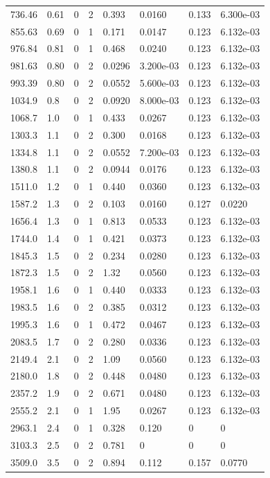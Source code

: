 \documentclass[preview]{standalone}
\begin{document}
{{\begin{tabular}{L{1.2cm}C{1.2cm} C{0.3cm}C{0.5cm} C{1.4cm}C{1.4cm} C{1.4cm}C{1.4cm}}
  736.46  &  0.61  & 0     &  2 &  0.393  & 0.0160  & 0.133 &  6.300e-03   \\ 
  855.63  &  0.69  & 0     &  1 &  0.171  & 0.0147  & 0.123 &  6.132e-03   \\ 
  976.84  &  0.81  & 0     &  1 &  0.468  & 0.0240  & 0.123 &  6.132e-03   \\ 
  981.63  &  0.80  & 0     &  2 &  0.0296  & 3.200e-03  & 0.123 &  6.132e-03   \\ 
  993.39  &  0.80  & 0     &  2 &  0.0552  & 5.600e-03  & 0.123 &  6.132e-03   \\ 
  1034.9  &   0.8  & 0     &  2 &  0.0920  & 8.000e-03  & 0.123 &  6.132e-03   \\ 
  1068.7  &   1.0  & 0     &  1 &  0.433  & 0.0267  & 0.123 &  6.132e-03   \\ 
  1303.3  &   1.1  & 0     &  2 &  0.300  & 0.0168  & 0.123 &  6.132e-03   \\ 
  1334.8  &   1.1  & 0     &  2 &  0.0552  & 7.200e-03  & 0.123 &  6.132e-03   \\ 
  1380.8  &   1.1  & 0     &  2 &  0.0944  & 0.0176  & 0.123 &  6.132e-03   \\ 
  1511.0  &   1.2  & 0     &  1 &  0.440  & 0.0360  & 0.123 &  6.132e-03   \\ 
  1587.2  &   1.3  & 0     &  2 &  0.103  & 0.0160  & 0.127 &  0.0220   \\ 
  1656.4  &   1.3  & 0     &  1 &  0.813  & 0.0533  & 0.123 &  6.132e-03   \\ 
  1744.0  &   1.4  & 0     &  1 &  0.421  & 0.0373  & 0.123 &  6.132e-03   \\ 
  1845.3  &   1.5  & 0     &  2 &  0.234  & 0.0280  & 0.123 &  6.132e-03   \\ 
  1872.3  &   1.5  & 0     &  2 &  1.32  & 0.0560  & 0.123 &  6.132e-03   \\ 
  1958.1  &   1.6  & 0     &  1 &  0.440  & 0.0333  & 0.123 &  6.132e-03   \\ 
  1983.5  &   1.6  & 0     &  2 &  0.385  & 0.0312  & 0.123 &  6.132e-03   \\ 
  1995.3  &   1.6  & 0     &  1 &  0.472  & 0.0467  & 0.123 &  6.132e-03   \\ 
  2083.5  &   1.7  & 0     &  2 &  0.280  & 0.0336  & 0.123 &  6.132e-03   \\ 
  2149.4  &   2.1  & 0     &  2 &  1.09  & 0.0560  & 0.123 &  6.132e-03   \\ 
  2180.0  &   1.8  & 0     &  2 &  0.448  & 0.0480  & 0.123 &  6.132e-03   \\ 
  2357.2  &   1.9  & 0     &  2 &  0.671  & 0.0480  & 0.123 &  6.132e-03   \\ 
  2555.2  &   2.1  & 0     &  1 &  1.95  & 0.0267  & 0.123 &  6.132e-03   \\ 
  2963.1  &   2.4  & 0     &  1 &  0.328  & 0.120  & 0 &  0   \\ 
  3103.3  &   2.5  & 0     &  2 &  0.781  & 0  & 0 &  0   \\ 
  3509.0  &   3.5  & 0     &  2 &  0.894  & 0.112  & 0.157 &  0.0770   \\ 
\hline 
\end{tabular} 

}}
\end{document}
